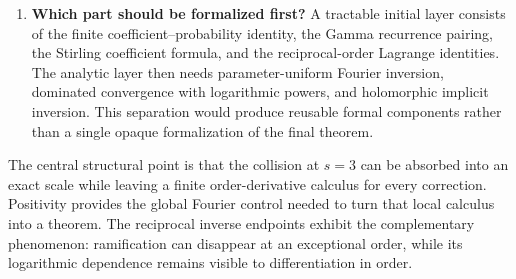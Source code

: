 \begin{enumerate}[label=\textbf{R\arabic*.},leftmargin=*]
\item \textbf{Which part should be formalized first?}
A tractable initial layer consists of the finite
coefficient--probability identity, the Gamma recurrence
pairing, the Stirling coefficient formula, and the
reciprocal-order Lagrange identities. The analytic layer
then needs parameter-uniform Fourier inversion,
dominated convergence with logarithmic powers, and
holomorphic implicit inversion. This separation would
produce reusable formal components rather than a
single opaque formalization of the final theorem.
\end{enumerate}

The central structural point is that the collision at $s=3$ can be
absorbed into an exact scale while leaving a finite order-derivative
calculus for every correction. Positivity provides the global Fourier
control needed to turn that local calculus into a theorem. The
reciprocal inverse endpoints exhibit the complementary phenomenon:
ramification can disappear at an exceptional order, while its
logarithmic dependence remains visible to differentiation in order.
